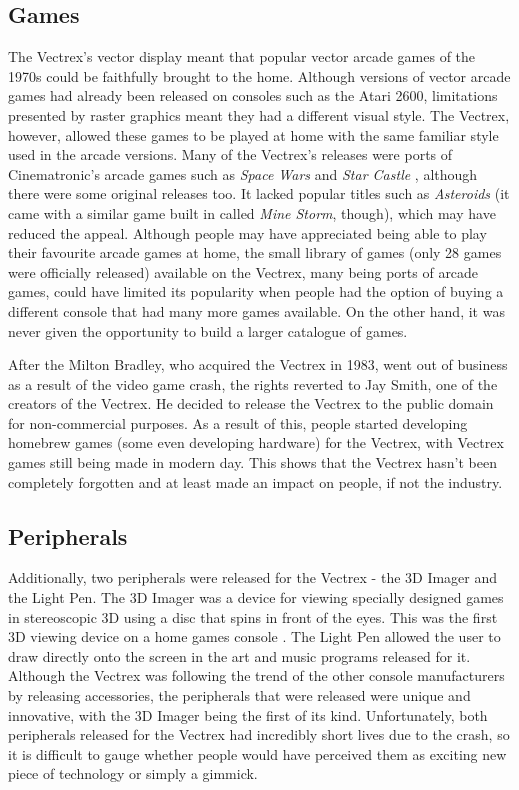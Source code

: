 \documentclass{scrartcl}
\begin{document}
\subsection*{Games}
The Vectrex's vector display meant that popular vector arcade games of the 1970s could be faithfully brought to the home. Although versions of vector arcade games had already been released on consoles such as the Atari 2600, limitations presented by raster graphics meant they had a different visual style\cite{}. The Vectrex, however, allowed these games to be played at home with the same familiar style used in the arcade versions. Many of the Vectrex's releases were ports of Cinematronic's arcade games such as \textit{Space Wars} and \textit{Star Castle} \cite{}, although there were some original releases too. It lacked popular titles such as \textit{Asteroids} (it came with a similar game built in called \textit{Mine Storm}, though), which may have reduced the appeal. Although people may have appreciated being able to play their favourite arcade games at home, the small library of games (only 28 games were officially released) available on the Vectrex, many being ports of arcade games, could have limited its popularity when people had the option of buying a different console that had many more games available. On the other hand, it was never given the opportunity to build a larger catalogue of games. 

After the Milton Bradley, who acquired the Vectrex in 1983, went out of business as a result of the video game crash, the rights reverted to Jay Smith, one of the creators of the Vectrex. He decided to release the Vectrex to the public domain for non-commercial purposes\cite{wolf:pong}. As a result of this, people started developing homebrew games (some even developing hardware\cite{madtronix}) for the Vectrex, with Vectrex games still being made in modern day. This shows that the Vectrex hasn't been completely forgotten and at least made an impact on people, if not the industry.


\subsection*{Peripherals} %
Additionally, two peripherals were released for the Vectrex - the 3D Imager and the Light Pen. The 3D Imager was a device for viewing specially designed games in stereoscopic 3D using a disc that spins in front of the eyes\cite{zachara:stereo}. This was the first 3D viewing device on a home games console \cite{}. The Light Pen allowed the user to draw directly onto the screen in the art and music programs released for it. Although the Vectrex was following the trend of the other console manufacturers by releasing accessories, the peripherals that were released were unique and innovative, with the 3D Imager being the first of its kind\cite{}. Unfortunately, both peripherals released for the Vectrex had incredibly short lives due to the crash, so it is difficult to gauge whether people would have perceived them as exciting new piece of technology or simply a gimmick.
\end{document}
